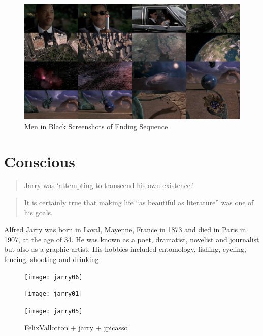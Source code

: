 \begin{figure}[htb] %
  \centering
  \includegraphics[width=\linewidth]{images/mib}
  \caption[Men in Black]{Men in Black Screenshots of Ending Sequence}
\label{fig:MIB}
\end{figure}

\section{Conscious}

\begin{quotation}
  Jarry was `attempting to transcend his own existence.' 
\end{quotation}

\begin{quotation}
  It is certainly true that making life ``as beautiful as literature'' was one of his goals. 
\end{quotation}

Alfred Jarry was born in Laval, Mayenne, France in 1873 and died in Paris in 1907, at the age of 34. He was known as a poet, dramatist, novelist and journalist but also as a graphic artist. His hobbies included entomology, fishing, cycling, fencing, shooting and drinking.

\begin{figure}[htb]
  \centering
  \begin{minipage}{.275\linewidth}
    \texttt{[image: jarry06]}
  \end{minipage}
  \hspace{.05\linewidth}
  \begin{minipage}{.275\linewidth}
    \texttt{[image: jarry01]}
  \end{minipage}
  \hspace{.05\linewidth}
  \begin{minipage}{.275\linewidth}
    \texttt{[image: jarry05]}
  \end{minipage}
  \caption[figures1--3]{FelixVallotton + jarry + jpicasso}
\label{img123}
\end{figure}

